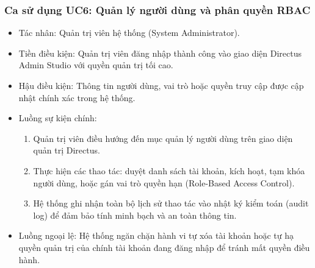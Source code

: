 \subsubsection{Ca sử dụng UC6: Quản lý người dùng và phân quyền RBAC}
\begin{itemize}
    \item Tác nhân: Quản trị viên hệ thống (System Administrator).
    \item Tiền điều kiện: Quản trị viên đăng nhập thành công vào giao diện Directus Admin Studio với quyền quản trị tối cao.
    \item Hậu điều kiện: Thông tin người dùng, vai trò hoặc quyền truy cập được cập nhật chính xác trong hệ thống.
    \item Luồng sự kiện chính:
    \begin{enumerate}
        \item Quản trị viên điều hướng đến mục quản lý người dùng trên giao diện quản trị Directus.
        \item Thực hiện các thao tác: duyệt danh sách tài khoản, kích hoạt, tạm khóa người dùng, hoặc gán vai trò quyền hạn (Role-Based Access Control).
        \item Hệ thống ghi nhận toàn bộ lịch sử thao tác vào nhật ký kiểm toán (audit log) để đảm bảo tính minh bạch và an toàn thông tin.
    \end{enumerate}
    \item Luồng ngoại lệ: Hệ thống ngăn chặn hành vi tự xóa tài khoản hoặc tự hạ quyền quản trị của chính tài khoản đang đăng nhập để tránh mất quyền điều hành.
\end{itemize}

